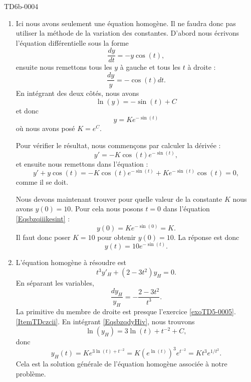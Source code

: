 \begin{corrige}{TD6b-0004}
\begin{enumerate}
		\item
			Ici nous avons seulement une équation homogène. Il ne faudra donc pas utiliser la méthode de la variation des constantes. D'abord nous écrivons l'équation différentielle sous la forme
			\begin{equation}
				\frac{ dy }{ dt }=-y\cos(t),
			\end{equation}
			ensuite nous remettons tous les $y$ à gauche et tous les $t$ à droite :
			\begin{equation}
				\frac{ dy }{ y }=-\cos(t)dt.
			\end{equation}
			En intégrant des deux côtés, nous avons
			\begin{equation}
				\ln(y)=-\sin(t)+C
			\end{equation}
			et donc
			\begin{equation}		\label{Eqsbzqiiikesint}
				y= Ke^{-\sin(t)}
			\end{equation}
			où nous avons posé $K= e^{C}$.
			
			Pour vérifier le résultat, nous commençons par calculer la dérivée :
			\begin{equation}
				y'=-K\cos(t) e^{-\sin(t)},
			\end{equation}
			et ensuite nous remettons dans l'équation :
			\begin{equation}
				y'+y\cos(t)=-K\cos(t) e^{-\sin(t)}+K e^{-\sin(t)}\cos(t)=0,
			\end{equation}
			comme il se doit.

			Nous devons maintenant trouver pour quelle valeur de la constante $K$ nous avons $y(0)=10$. Pour cela nous posons $t=0$ dans l'équation \eqref{Eqsbzqiiikesint} :
			\begin{equation}
				y(0)=K e^{-\sin(0)}=K.
			\end{equation}
			Il faut donc poser $K=10$ pour obtenir $y(0)=10$. La réponse est donc
			\begin{equation}
				y(t)=10 e^{-\sin(t)}.
			\end{equation}
		\item
			L'équation homogène à résoudre est
			\begin{equation}
				t^3y'_H+(2-3t^2)y_H=0.
			\end{equation}
			En séparant les variables,
			\begin{equation}		\label{EqsbzqdyHiv}
				\frac{ dy_H }{ y_H }=-\frac{ 2-3t^2 }{ t^3 }.
			\end{equation}
			La primitive du membre de droite est presque l'exercice \ref{exoTD5-0005}.\ref{ItemTDczcii}. En intégrant \eqref{EqsbzqdyHiv}, nous trouvons
			\begin{equation}
				\ln(y_H)=3\ln(t)+t^{-2}+C,
			\end{equation}
			donc
			\begin{equation}
                y_H(t)=K e^{3\ln(t)+t^{-2}}=K\left(  e^{\ln(t)} \right)^3 e^{t^{-2}}=Kt^3 e^{1/t^2}.
			\end{equation}
			Cela est la solution générale de l'équation homogène associée à notre problème.


\end{enumerate}
\end{corrige}
